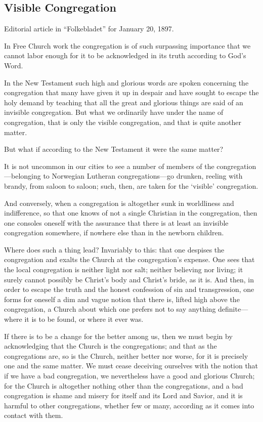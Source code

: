 
\subsection{Visible Congregation}

Editorial article in “Folkebladet” for January 20, 1897.

In Free Church work the congregation is of such surpassing importance that we cannot labor enough for it to be acknowledged in its truth according to God’s Word.

In the New Testament such high and glorious words are spoken concerning the congregation that many have given it up in despair and have sought to escape the holy demand by teaching that all the great and glorious things are said of an invisible congregation. But what we ordinarily have under the name of congregation, that is only the visible congregation, and that is quite another matter.

But what if according to the New Testament it were the same matter?

It is not uncommon in our cities to see a number of members of the congregation—belonging to Norwegian Lutheran congregations—go drunken, reeling with brandy, from saloon to saloon; such, then, are taken for the ‘visible’ congregation.

And conversely, when a congregation is altogether sunk in worldliness and indifference, so that one knows of not a single Christian in the congregation, then one consoles oneself with the assurance that there is at least an invisible congregation somewhere, if nowhere else than in the newborn children.

Where does such a thing lead? Invariably to this: that one despises the congregation and exalts the Church at the congregation’s expense. One sees that the local congregation is neither light nor salt; neither believing nor living; it surely cannot possibly be Christ’s body and Christ’s bride, as it is. And then, in order to escape the truth and the honest confession of sin and transgression, one forms for oneself a dim and vague notion that there is, lifted high above the congregation, a Church about which one prefers not to say anything definite—where it is to be found, or where it ever was.

If there is to be a change for the better among us, then we must begin by acknowledging that the Church is the congregations; and that as the congregations are, so is the Church, neither better nor worse, for it is precisely one and the same matter. We must cease deceiving ourselves with the notion that if we have a bad congregation, we nevertheless have a good and glorious Church; for the Church is altogether nothing other than the congregations, and a bad congregation is shame and misery for itself and its Lord and Savior, and it is harmful to other congregations, whether few or many, according as it comes into contact with them.


